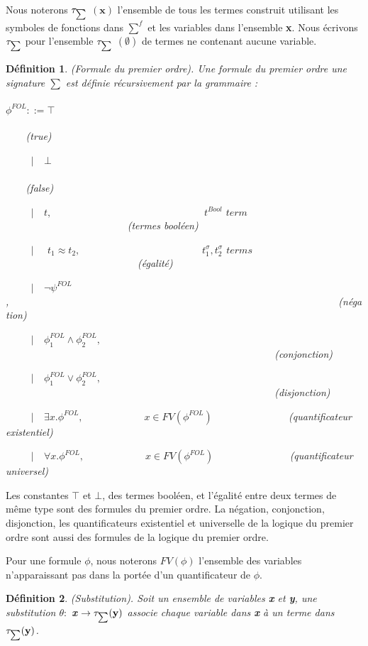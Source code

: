 \documentclass[9pt]{book}
\newcommand\smallsum{\mathsmaller\sum}
\newtheorem{definition}{D\'efinition}[section]
\begin{document}
Nous noterons $\tau_{\mathsmaller\sum}$ $(\textbf{x})$ l'ensemble de tous les termes construit utilisant les symboles de fonctions dans $\sum^{f}$ et les variables dans l'ensemble \textbf{x}. Nous \'ecrivons $\tau_{\mathsmaller\sum}$ pour l'ensemble $\tau_{\mathsmaller\sum}$ $(\emptyset)$ de termes ne contenant aucune variable.
\begin{definition} 
(Formule du premier ordre). Une formule du premier ordre une signature $\sum$ est d\'efinie r\'ecursivement par la grammaire :\\
\\$\phi^{FOL} ::= \top$~~~~~~~~~~~~~~~~~~~~~~~~~~~~~~~~~~~~~~~~~~~~~~~~~~~~~~~~~~~~~~~~~~~~~~~~~~(true)\par
~~~~~$|$~~$\bot$~~~~~~~~~~~~~~~~~~~~~~~~~~~~~~~~~~~~~~~~~~~~~~~~~~~~~~~~~~~~~~~~~~~~~~~~~~(false)
\par
~~~~~$|$~~$t,$~~~~~~~~~~~~~~~~~~~~~~~~~~~~~~$t^{Bool}$ $term$~~~~~~~~~~~~~~~~~~~~~~~~(termes bool\'een)\par
~~~~~$|$~~ $t_{1} \approx t_{2},$~~~~~~~~~~~~~~~~~~~~~~~~$t_{1}^{\sigma},t_{2}^{\sigma}$ $terms$~~~~~~~~~~~~~~~~~~~~~~~~~~(\'egalit\'e)\par
~~~~~$|$~~$\neg\psi^{FOL}$,~~~~~~~~~~~~~~~~~~~~~~~~~~~~~~~~~~~~~~~~~~~~~~~~~~~~~~~~~~~~~~~~~(n\'egation)\par
~~~~~$|$~~$\phi_{1}^{FOL} \land \phi_{2}^{FOL},$~~~~~~~~~~~~~~~~~~~~~~~~~~~~~~~~~~~~~~~~~~~~~~~~~~~~~(conjonction)\par
~~~~~$|$~~$\phi_{1}^{FOL} \lor \phi_{2}^{FOL},$~~~~~~~~~~~~~~~~~~~~~~~~~~~~~~~~~~~~~~~~~~~~~~~~~~~~~(disjonction)\par
~~~~~$|$~~$\exists x.\phi^{FOL},$~~~~~~~~~~~~$x\in FV(\phi^{FOL})$~~~~~~~~~~~~~~~(quantificateur existentiel)\par
~~~~~$|$~~$\forall x.\phi^{FOL},$~~~~~~~~~~~~$x\in FV(\phi^{FOL})$~~~~~~~~~~~~~~~(quantificateur universel)
\end{definition}
Les constantes $\top$ et $\bot$, des termes bool\'een, et l'\'egalit\'e entre deux termes de m\^eme type sont des formules du premier ordre. La n\'egation, conjonction, disjonction, les quantificateurs existentiel et universelle de la logique du premier ordre sont aussi des formules de la logique du premier ordre.\par
	Pour une formule $\phi$, nous noterons $FV(\phi)$ l'ensemble des variables n'apparaissant pas dans la port\'ee d'un quantificateur de $\phi$.

\begin{definition}
(Substitution). Soit un ensemble de variables \textbf{x} et \textbf{y}, une substitution $\theta :$ \textbf{x} $\rightarrow \tau_{\smallsum}(\textbf{y})$ associe chaque variable dans \textbf{x} \`a un terme dans $\tau_{\mathsmaller\sum}(\textbf{y})$.
\end{definition}
\end{document}
